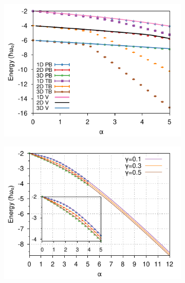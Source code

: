 \begin{figure}
  \begin{subfigure}[b]{0.49\textwidth}
    \includegraphics[width=\textwidth]{figures/holstein-1dto3d-alpha-energy-omega-diagmc-COLOUR.pdf}
  \end{subfigure}
  \begin{subfigure}[b]{0.49\textwidth}
    \includegraphics[width=\textwidth]{figures/holstein-1d-alpha-energy-adiabaticity-diagmc-COLOUR.pdf}
  \end{subfigure}
  \begin{subfigure}[b]{0.49\textwidth}

\end{subfigure}
\end{figure}

